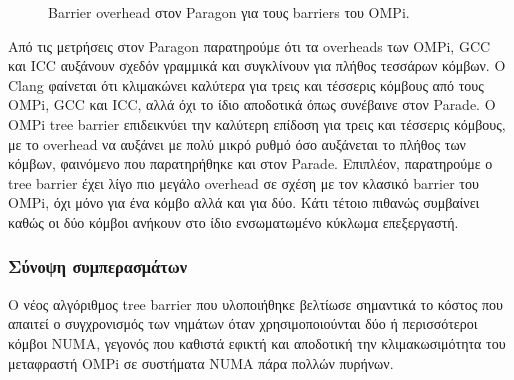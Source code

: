 \begin{figure}
\begin{minipage}{0.48\textwidth}
        \caption{Barrier overhead στον Paragon για τους barriers του OMPi.}
        \label{fig:bo-paragon-default-places-ompionly}
    \end{minipage}
\end{figure}


%
%

Από τις μετρήσεις στον Paragon παρατηρούμε ότι τα overheads των OMPi, GCC και ICC αυξάνουν σχεδόν γραμμικά και συγκλίνουν για πλήθος τεσσάρων κόμβων. Ο Clang φαίνεται ότι κλιμακώνει καλύτερα για τρεις και τέσσερις κόμβους από τους OMPi, GCC και ICC, αλλά όχι το ίδιο αποδοτικά όπως συνέβαινε στον Parade. Ο OMPi tree barrier επιδεικνύει την καλύτερη επίδοση για τρεις και τέσσερις κόμβους, με το overhead να αυξάνει με πολύ μικρό ρυθμό όσο αυξάνεται το πλήθος των κόμβων, φαινόμενο που παρατηρήθηκε και στον Parade. Επιπλέον, παρατηρούμε ο tree barrier έχει λίγο πιο μεγάλο overhead σε σχέση με τον κλασικό barrier του OMPi, όχι μόνο για ένα κόμβο αλλά και για δύο. Κάτι τέτοιο πιθανώς συμβαίνει καθώς οι δύο κόμβοι ανήκουν στο ίδιο ενσωματωμένο κύκλωμα επεξεργαστή.


\subsubsection{Σύνοψη συμπερασμάτων}
Ο νέος αλγόριθμος tree barrier που υλοποιήθηκε βελτίωσε σημαντικά το κόστος που απαιτεί ο συγχρονισμός των νημάτων όταν χρησιμοποιούνται δύο ή περισσότεροι κόμβοι NUMA, γεγονός που καθιστά εφικτή και αποδοτική την κλιμακωσιμότητα του μεταφραστή OMPi σε συστήματα NUMA πάρα πολλών πυρήνων.

